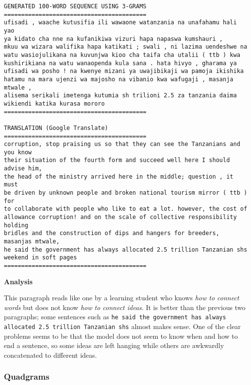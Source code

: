 \begin{center}
\begin{verbatim}
GENERATED 100-WORD SEQUENCE USING 3-GRAMS
=========================================
ufisadi , waache kutusifia ili wawaone watanzania na unafahamu hali yao
ya kidato cha nne na kufanikiwa vizuri hapa napaswa kumshauri ,
mkuu wa wizara walifika hapa katikati ; swali , ni lazima uendeshwe na
watu wasiojulikana na kuvunjwa kioo cha taifa cha utalii ( ttb ) kwa
kushirikiana na watu wanaopenda kula sana . hata hivyo , gharama ya
ufisadi wa posho ! na kwenye mizani ya uwajibikaji wa pamoja ikishika
hatamu na mara ujenzi wa majosho na vibanio kwa wafugaji , masanja mtwale ,
alisema serikali imetenga kutumia sh trilioni 2.5 za tanzania daima
wikiendi katika kurasa mororo
=========================================

TRANSLATION (Google Translate)
=========================================
corruption, stop praising us so that they can see the Tanzanians and you know
their situation of the fourth form and succeed well here I should advise him,
the head of the ministry arrived here in the middle; question , it must
be driven by unknown people and broken national tourism mirror ( ttb ) for
to collaborate with people who like to eat a lot. however, the cost of
allowance corruption! and on the scale of collective responsibility holding
bridles and the construction of dips and hangers for breeders, masanjas mtwale,
he said the government has always allocated 2.5 trillion Tanzanian shs
weekend in soft pages
=========================================
\end{verbatim}
\end{center}

\textbf{Analysis}

This paragraph reads like one by a learning student who knows
\emph{how to connect words} but does not know
\emph{how to connect ideas}.
It is better than the previous two paragraphs;
some sentences such as \verb|he said the government has always allocated 2.5 trillion Tanzanian shs|
almost makes sense. One of the clear problems seems to be that the model
does not seem to know when and how to end a sentence, so some ideas are left hanging
while others are awkwardly concatenated to different ideas.

\newpage
\subsubsection{Quadgrams}

